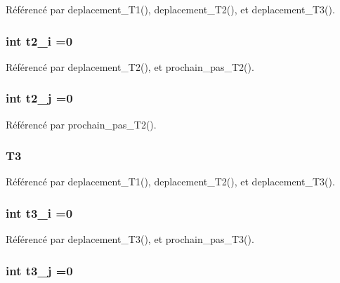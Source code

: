 Référencé par deplacement\+\_\+\+T1(), deplacement\+\_\+\+T2(), et deplacement\+\_\+\+T3().

\subsubsection[{t2\+\_\+i}]{\setlength{\rightskip}{0pt plus 5cm}int t2\+\_\+i =0}\label{thread_8h_a7eb268dc73344b7b5bb1c4ad1e9b8029}


Référencé par deplacement\+\_\+\+T2(), et prochain\+\_\+pas\+\_\+\+T2().

\subsubsection[{t2\+\_\+j}]{\setlength{\rightskip}{0pt plus 5cm}int t2\+\_\+j =0}\label{thread_8h_ab88718510b8996c0a7add100d4bc2c26}


Référencé par prochain\+\_\+pas\+\_\+\+T2().

\subsubsection[{T3}]{ T3}\label{thread_8h_a79960566a6908cd12bcfec57c02e4981}


Référencé par deplacement\+\_\+\+T1(), deplacement\+\_\+\+T2(), et deplacement\+\_\+\+T3().

\subsubsection[{t3\+\_\+i}]{\setlength{\rightskip}{0pt plus 5cm}int t3\+\_\+i =0}\label{thread_8h_ade48de6836e075d2438d4318c2d384e1}


Référencé par deplacement\+\_\+\+T3(), et prochain\+\_\+pas\+\_\+\+T3().

\subsubsection[{t3\+\_\+j}]{\setlength{\rightskip}{0pt plus 5cm}int t3\+\_\+j =0}\label{thread_8h_a2abaab027ef8c5aba4299c98b8ce5ff6}


